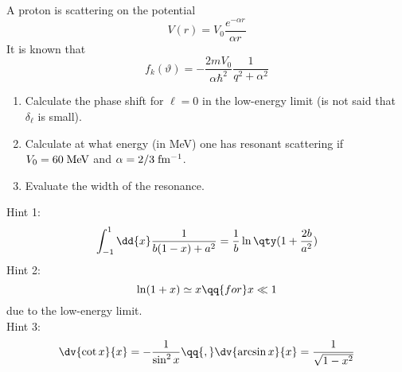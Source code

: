 \begin{esercizio}
   A proton is scattering on the potential
   \begin{equation*}
      V(r)=V_0 \frac{e^{-\alpha r}}{\alpha r}
   \end{equation*}
   It is known that
   \begin{equation*}
      f_k(\vartheta)
      =-\frac{2m V_0}{\alpha \hbar^2} \frac{1}{q^2 + \alpha^2}
   \end{equation*}
   \begin{enumerate}[label=\alph*), leftmargin=0.6cm]
      \item Calculate the phase shift for $\ell=0$ in the low-energy limit (is not said that $\delta_{\ell}$ is small).
      \item Calculate at what energy (in MeV) one has resonant scattering if $V_0=60 \rm \; MeV$ and $\alpha=2/3 \rm \; fm^{-1}$.
      \item Evaluate the width of the resonance.
   \end{enumerate}
   Hint 1:
   \begin{equation*}
      \int_{-1}^{1} \dd{x} \frac{1}{b(1-x) + a^2}
      =\frac{1}{b} \ln\qty( 1 + \frac{2b}{a^2} )
   \end{equation*}
   Hint 2:
   \begin{equation*}
      \ln( 1 + x )
      \simeq x
      \qq{for}
      x \ll 1
   \end{equation*}
   due to the low-energy limit.\\
   Hint 3:
   \begin{equation*}
      \dv{\cot{x}}{x}
      =-\frac{1}{\sin^2{x}}
      \qq{,}
      \dv{\arcsin{x}}{x}
      =\frac{1}{\sqrt{1 - x^2}}
   \end{equation*}
\end{esercizio}
